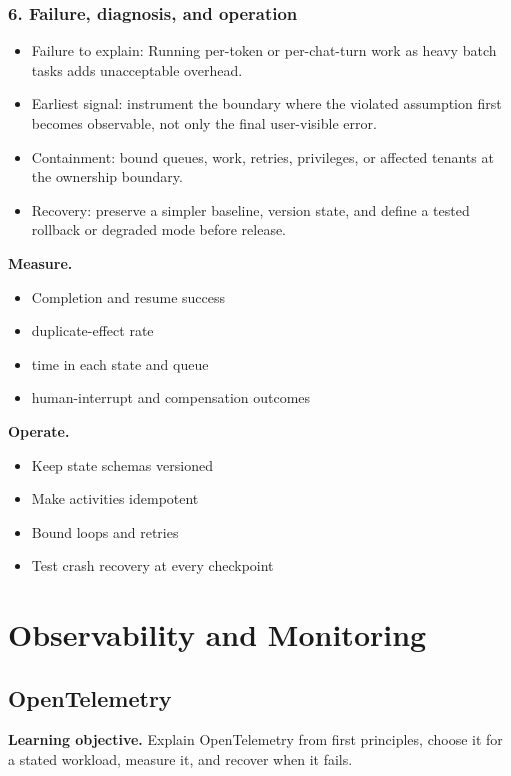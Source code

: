 \subsubsection*{6. Failure, diagnosis, and operation}
\begin{itemize}
\item Failure to explain: Running per-token or per-chat-turn work as heavy batch tasks adds unacceptable overhead.
\item Earliest signal: instrument the boundary where the violated assumption first becomes observable, not only the final user-visible error.
\item Containment: bound queues, work, retries, privileges, or affected tenants at the ownership boundary.
\item Recovery: preserve a simpler baseline, version state, and define a tested rollback or degraded mode before release.
\end{itemize}
\textbf{Measure.}\begin{itemize}
\item Completion and resume success
\item duplicate-effect rate
\item time in each state and queue
\item human-interrupt and compensation outcomes
\end{itemize}
\textbf{Operate.}\begin{itemize}
\item Keep state schemas versioned
\item Make activities idempotent
\item Bound loops and retries
\item Test crash recovery at every checkpoint
\end{itemize}
\clearpage\section{Observability and Monitoring}
\subsection{OpenTelemetry}
\textbf{Learning objective.} Explain OpenTelemetry from first principles, choose it for a stated workload, measure it, and recover when it fails.

